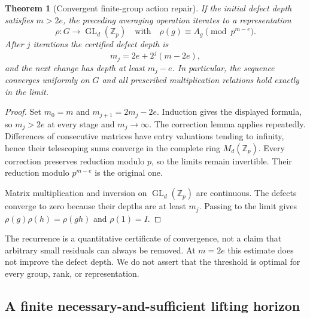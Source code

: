 \documentclass[11pt]{article}
\newtheorem{theorem}{Theorem}[section]
\theoremstyle{definition}
\theoremstyle{remark}
\begin{document}
\begin{theorem}[Convergent finite-group action repair]\label{thm:convergent-action-repair}
If the initial defect depth satisfies $m>2e$, the preceding averaging operation iterates to a representation
\[
 \rho:G\longrightarrow\operatorname{GL}_d(\mathbb Z_p)
 \quad\text{with}\quad
 \rho(g)\equiv A_g\pmod{p^{m-e}}.
\]
After $j$ iterations the certified defect depth is
\[
 m_j=2e+2^j(m-2e),
\]
and the next change has depth at least $m_j-e$. In particular, the sequence converges uniformly on $G$ and all prescribed multiplication relations hold exactly in the limit.
\end{theorem}
\begin{proof}
Set $m_0=m$ and $m_{j+1}=2m_j-2e$. Induction gives the displayed formula, so $m_j>2e$ at every stage and $m_j\to\infty$. The correction lemma applies repeatedly. Differences of consecutive matrices have entry valuations tending to infinity, hence their telescoping sums converge in the complete ring $M_d(\mathbb Z_p)$. Every correction preserves reduction modulo $p$, so the limits remain invertible. Their reduction modulo $p^{m-e}$ is the original one.

Matrix multiplication and inversion on $\operatorname{GL}_d(\mathbb Z_p)$ are continuous. The defects converge to zero because their depths are at least $m_j$. Passing to the limit gives $\rho(g)\rho(h)=\rho(gh)$ and $\rho(1)=I$.
\end{proof}

The recurrence is a quantitative certificate of convergence, not a claim that arbitrary small residuals can always be removed. At $m=2e$ this estimate does not improve the defect depth. We do not assert that the threshold is optimal for every group, rank, or representation.

\subsection{A finite necessary-and-sufficient lifting horizon}
\end{document}
